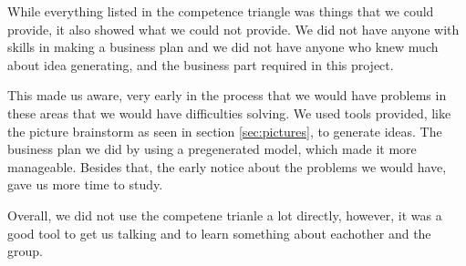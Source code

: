 While everything listed in the competence triangle was things that we could provide, it also showed what we could not provide.
We did not have anyone with skills in making a business plan and we did not have anyone who knew much about idea generating, and the business part required in this project.

This made us aware, very early in the process that we would have problems in these areas that we would have difficulties solving. We used tools provided, like the picture brainstorm as seen in section \ref{sec:pictures}, to generate ideas. The business plan we did by using a pregenerated model, which made it more manageable. Besides that, the early notice about the problems we would have, gave us more time to study. 

Overall, we did not use the competene trianle a lot directly, however, it was a good tool to get us talking and to learn something about eachother and the group. 
